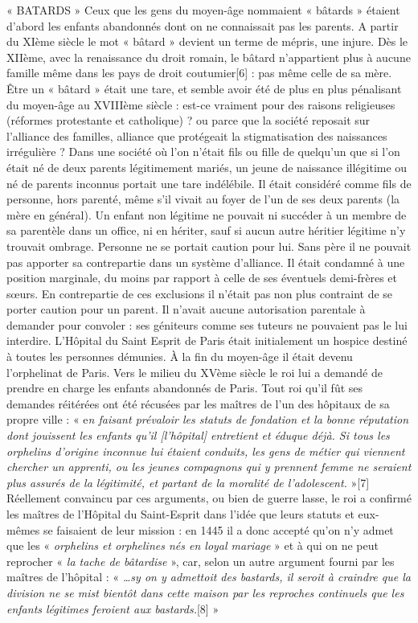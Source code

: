 « BATARDS »
 Ceux que les gens du moyen-âge nommaient « bâtards » étaient d'abord les enfants abandonnés dont on ne connaissait pas les parents. A partir du XIème siècle le mot « bâtard » devient un terme de mépris, une injure. Dès le XIIème, avec la renaissance du droit romain, le bâtard n'appartient plus à aucune famille même dans les pays de droit coutumier[6] : pas même celle de sa mère. Être un « bâtard » était une tare, et semble avoir été de plus en plus pénalisant du moyen-âge au XVIIIème siècle : est-ce vraiment pour des raisons religieuses (réformes protestante et catholique) ? ou parce que la société reposait sur l'alliance des familles, alliance que protégeait la stigmatisation des naissances irrégulière ?
 Dans une société où l'on n'était fils ou fille de quelqu'un que si l'on était né de deux parents légitimement mariés, un jeune de naissance illégitime ou né de parents inconnus portait une tare indélébile. Il était considéré comme fils de personne, hors parenté, même s'il vivait au foyer de l'un de ses deux parents (la mère en général). Un enfant non légitime ne pouvait ni succéder à un membre de sa parentèle dans un office, ni en hériter, sauf si aucun autre héritier légitime n'y trouvait ombrage. Personne ne se portait caution pour lui. Sans père il ne pouvait pas apporter sa contrepartie dans un système d'alliance. Il était condamné à une position marginale, du moins par rapport à celle de ses éventuels demi-frères et sœurs. En contrepartie de ces exclusions il n'était pas non plus contraint de se porter caution pour un parent. Il n'avait aucune autorisation parentale à demander pour convoler : ses géniteurs comme ses tuteurs ne pouvaient pas le lui interdire.
 L'Hôpital du Saint Esprit de Paris était initialement un hospice destiné à toutes les personnes démunies. À la fin du moyen-âge il était devenu l'orphelinat de Paris. Vers le milieu du XVème siècle le roi lui a demandé de prendre en charge les enfants abandonnés de Paris. Tout roi qu'il fût ses demandes réitérées ont été récusées par les maîtres de l'un des hôpitaux de sa propre ville : « e\emph{n faisant prévaloir les statuts de fondation et la bonne réputation dont jouissent les enfants qu'il [l'hôpital] entretient et éduque déjà. Si tous les orphelins d'origine inconnue lui étaient conduits, les gens de métier qui viennent chercher un apprenti, ou les jeunes compagnons qui y prennent femme ne seraient plus assurés de la légitimité, et partant de la moralité de l'adolescent.} »[7]
 Réellement convaincu par ces arguments, ou bien de guerre lasse, le roi a confirmé les maîtres de l'Hôpital du Saint-Esprit dans l'idée que leurs statuts et eux-mêmes se faisaient de leur mission : en 1445 il a donc accepté qu'on n'y admet que les « \emph{orphelins et orphelines nés en loyal mariage} » et à qui on ne peut reprocher « \emph{la tache de bâtardise} », car, selon un autre argument fourni par les maîtres de l'hôpital : « \emph{…sy on y admettoit des bastards, il seroit à craindre que la division ne se mist bientôt dans cette maison par les reproches continuels que les enfants légitimes feroient aux bastards.}[8] » 
